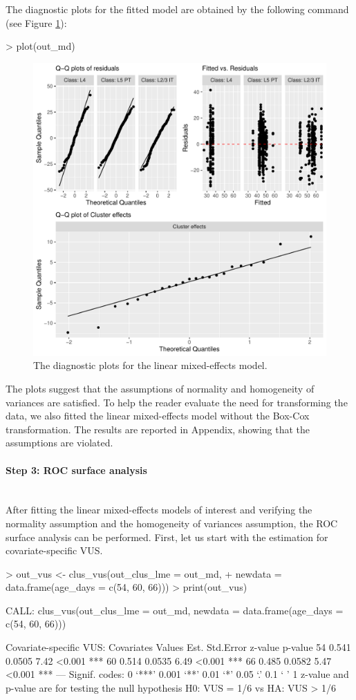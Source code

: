 \noindent
The diagnostic plots for the fitted model are obtained by the following command (see Figure \ref{fig:diag-md}):

\begin{example}
> plot(out_md)
\end{example}

\begin{figure}[htbp]
\centering 
\includegraphics[width=0.7\linewidth]{diagnosis_model.pdf}
\caption{The diagnostic plots for the linear {mixed-effects} model.}
\label{fig:diag-md}
\end{figure}

\noindent
The plots suggest that the assumptions of normality and homogeneity of variances are satisfied. To help the reader evaluate the need for transforming the data, we also fitted the linear mixed-effects model without the Box-Cox transformation. The results are reported in Appendix, showing that the assumptions are violated.

\paragraph{Step 3: ROC surface analysis} \text{}\\
After fitting the linear {mixed-effects} models of interest and verifying the {normality assumption} and {the homogeneity of variances assumption}, the ROC surface analysis can be performed. First, let us start with the estimation for covariate-specific VUS.

\begin{example}
> out_vus <- clus_vus(out_clus_lme = out_md, 
+                     newdata = data.frame(age_days = c(54, 60, 66)))
> print(out_vus)

CALL: clus_vus(out_clus_lme = out_md, newdata = data.frame(age_days = c(54, 
    60, 66)))
 
Covariate-specific VUS: 
 Covariates Values  Est. Std.Error z-value p-value    
                54 0.541    0.0505    7.42  <0.001 ***
                60 0.514    0.0535    6.49  <0.001 ***
                66 0.485    0.0582    5.47  <0.001 ***
---
Signif. codes:    0 ‘***’ 0.001 ‘**’ 0.01 ‘*’ 0.05 ‘.’ 0.1 ‘ ’ 1
z-value and p-value are for testing the null hypothesis H0: VUS = 1/6 vs HA: VUS > 1/6 
\end{example}

